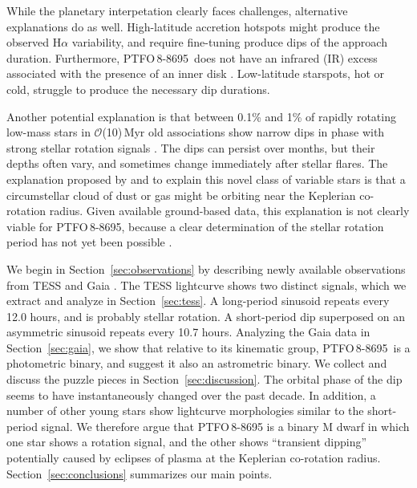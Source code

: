 \documentclass[12pt,twocolumn,tighten]{aastex62}
\newcommand{\ptfo}{PTFO$\,$8-8695}
\begin{document}
While the planetary interpetation clearly faces challenges,
alternative explanations do as well.  High-latitude accretion hotspots
might produce the observed H$\alpha$ variability, and require
fine-tuning produce dips of the approach duration. Furthermore, \ptfo\
does not have an infrared (IR) excess associated with the presence of
an inner disk \citep[{\it e.g.},][Figure~18]{yu_tests_2015}.
Low-latitude starspots, hot or cold, struggle to produce the necessary
dip durations.

Another potential explanation is that between 0.1\% and 1\% of rapidly
rotating low-mass stars in $\mathcal{O}$(10)$\,$Myr old associations
show narrow dips in phase with strong stellar rotation signals
\citep{rebull_usco_2018}.  The dips can persist over months, but their
depths often vary, and sometimes change immediately after stellar
flares.  The explanation proposed by \citet{stauffer_orbiting_2017}
and \citet{david_transient_2017} to explain this novel class of
variable stars is that a circumstellar cloud of dust or gas might be
orbiting near the Keplerian co-rotation radius.  Given available
ground-based data, this explanation is not clearly viable for \ptfo,
because a clear determination of the stellar rotation period has not
yet been possible
\citep{van_eyken_ptf_2012,koen_multicolour_2015,raetz_yeti_2016}.

We begin in Section~\ref{sec:observations} by describing newly
available observations from TESS \citep{ricker_transiting_2015} and
Gaia \citep{gaia_collaboration_gaia_2018}.  The TESS lightcurve shows
two distinct signals, which we extract and analyze in
Section~\ref{sec:tess}.  A long-period sinusoid repeats every 12.0
hours, and is probably stellar rotation.  A short-period dip superposed on an
asymmetric sinusoid repeats every 10.7 hours.  Analyzing the
Gaia data in Section~\ref{sec:gaia}, we show that relative to its
kinematic group, \ptfo\ is a photometric binary, and suggest it also an
astrometric binary.  We collect and discuss the puzzle pieces in
Section~\ref{sec:discussion}.  The orbital phase of the dip seems to
have instantaneously changed over the past decade.  In addition, a
number of other young stars show lightcurve morphologies similar to
the short-period signal.  We therefore argue that PTFO$\,$8-8695 is a
binary M dwarf in which one star shows a rotation signal, and the
other shows ``transient dipping'' potentially caused by eclipses of plasma at
the Keplerian co-rotation radius.  Section~\ref{sec:conclusions}
summarizes our main points.
\end{document}
